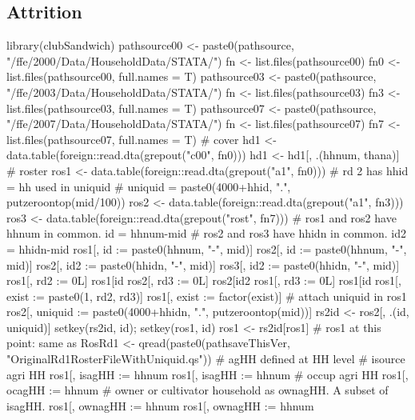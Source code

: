 \begin{minipage}[t]{14cm}
\begin{tabular}{>{\hfill\scriptsize}p{1cm}<{}>{\hfill\scriptsize}p{.25cm}<{}>{\scriptsize}p{12cm}<{\hfill}}
\end{tabular}
\end{minipage}




\subsection{Attrition}

\begin{Schunk}
\begin{Sinput}
library(clubSandwich)
pathsource00 <- paste0(pathsource, "/ffe/2000/Data/HouseholdData/STATA/")
fn <- list.files(pathsource00)
fn0 <- list.files(pathsource00, full.names = T)
pathsource03 <- paste0(pathsource, "/ffe/2003/Data/HouseholdData/STATA/")
fn <- list.files(pathsource03)
fn3 <- list.files(pathsource03, full.names = T)
pathsource07 <- paste0(pathsource, "/ffe/2007/Data/HouseholdData/STATA/")
fn <- list.files(pathsource07)
fn7 <- list.files(pathsource07, full.names = T)
# cover
hd1 <-  data.table(foreign::read.dta(grepout("c00", fn0)))
hd1 <- hd1[, .(hhnum, thana)]
# roster
ros1 <- data.table(foreign::read.dta(grepout("a1", fn0)))
# rd 2 has hhid = hh used in uniquid
# uniquid = paste0(4000+hhid, ".", putzeroontop(mid/100))
ros2 <- data.table(foreign::read.dta(grepout("a1", fn3)))
ros3 <- data.table(foreign::read.dta(grepout("rost", fn7)))
# ros1 and ros2 have hhnum in common. id = hhnum-mid
# ros2 and ros3 have hhidn in common. id2 = hhidn-mid
ros1[, id := paste0(hhnum, "-", mid)]
ros2[, id := paste0(hhnum, "-", mid)]
ros2[, id2 := paste0(hhidn, "-", mid)]
ros3[, id2 := paste0(hhidn, "-", mid)]
ros1[, rd2 := 0L]
ros1[id %in% ros2[, id], rd2 := 1L]
ros2[, rd3 := 0L]
ros2[id2 %in% ros3[, id2], rd3 := 1L]
ros1[, rd3 := 0L]
ros1[id %in% ros2[rd3==1L, id], rd3 := 1L]
ros1[, exist := paste0(1, rd2, rd3)]
ros1[, exist := factor(exist)]
# attach uniquid in ros1
ros2[, uniquid := paste0(4000+hhidn, ".", putzeroontop(mid))]
rs2id <- ros2[, .(id, uniquid)]
setkey(rs2id, id); setkey(ros1, id)
ros1 <- rs2id[ros1]
# ros1 at this point: same as RosRd1 <- qread(paste0(pathsaveThisVer, "OriginalRd1RosterFileWithUniquid.qs"))
# agHH defined at HH level
	#	isource agri HH
ros1[, isagHH := hhnum %in% hhnum[grep("Agri|Tena", isource)]]
ros1[, isagHH := hhnum %in% hhnum[grep("^1$|^6[12]$", isource)]]
	#	occup agri HH
ros1[, ocagHH := hhnum %in% hhnum[grep("Agri|Tenan|farm", occup)]]
	#	owner or cultivator household as ownagHH. A subset of isagHH.
ros1[, ownagHH := hhnum %in% hhnum[grep("OwnL|Tena", isource)]]
ros1[, ownagHH := hhnum %in% hhnum[grep("6[12]", isource)]]

\end{Sinput}
\end{Schunk}
